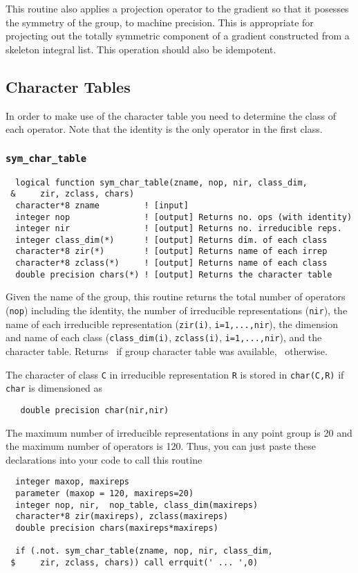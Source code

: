This routine also applies a projection operator
 to the gradient so that it posesses the
symmetry of the group, to machine precision.  This is appropriate for
projecting out the totally symmetric component of a gradient
constructed from a skeleton integral list.  This operation should also be
idempotent. 

\subsection{Character Tables}

In order to make use of the character table you need to determine the
class of each operator.  Note that the identity is the only operator
in the first class.

\subsubsection{{\tt sym\_char\_table}}
\begin{verbatim}
  logical function sym_char_table(zname, nop, nir, class_dim,
 &     zir, zclass, chars)
  character*8 zname         ! [input]
  integer nop               ! [output] Returns no. ops (with identity)
  integer nir               ! [output] Returns no. irreducible reps.
  integer class_dim(*)      ! [output] Returns dim. of each class
  character*8 zir(*)        ! [output] Returns name of each irrep
  character*8 zclass(*)     ! [output] Returns name of each class
  double precision chars(*) ! [output] Returns the character table
\end{verbatim}
Given the name of the group, this routine returns the
total number of operators (\verb+nop+) including the identity, the
number of irreducible representations (\verb+nir+), the name of each
irreducible representation (\verb+zir(i)+, \verb+i=1,...,nir+), the
dimension and name of each class (\verb+class_dim(i)+,
\verb+zclass(i)+, \verb+i=1,...,nir+), and the character table.  
Returns \TRUE\ if group character table was available, \FALSE\ 
otherwise.

The character of class \verb+C+ in irreducible representation \verb+R+
is stored in \verb+char(C,R)+ if \verb+char+ is dimensioned as
\begin{verbatim}
   double precision char(nir,nir)
\end{verbatim}
The maximum number of irreducible representations in any point group
is 20 and the maximum number of operators is 120.  Thus, you can just
paste these declarations into your code to call this routine
\begin{verbatim}
  integer maxop, maxireps     
  parameter (maxop = 120, maxireps=20)
  integer nop, nir,  nop_table, class_dim(maxireps)
  character*8 zir(maxireps), zclass(maxireps)
  double precision chars(maxireps*maxireps)

  if (.not. sym_char_table(zname, nop, nir, class_dim,
 $     zir, zclass, chars)) call errquit(' ... ',0)
\end{verbatim}


